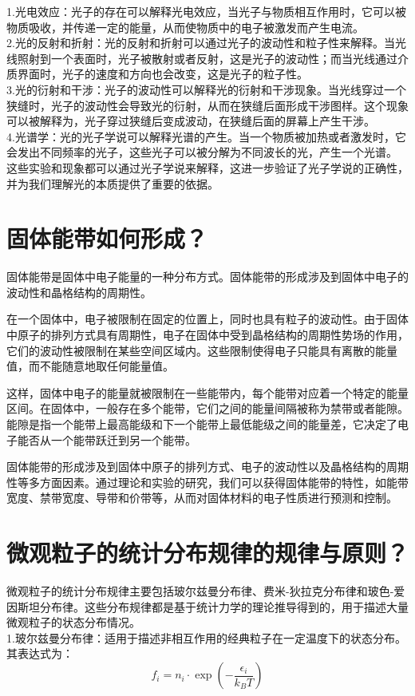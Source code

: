 \documentclass[12pt, a4paper, oneside]{article}
\begin{document}
\begin{spacing}{2.0}
1.光电效应：光子的存在可以解释光电效应，当光子与物质相互作用时，它可以被物质吸收，并传递一定的能量，从而使物质中的电子被激发而产生电流。
\\
2.光的反射和折射：光的反射和折射可以通过光子的波动性和粒子性来解释。当光线照射到一个表面时，光子被散射或者反射，这是光子的波动性；而当光线通过介质界面时，光子的速度和方向也会改变，这是光子的粒子性。
\\
3.光的衍射和干涉：光子的波动性可以解释光的衍射和干涉现象。当光线穿过一个狭缝时，光子的波动性会导致光的衍射，从而在狭缝后面形成干涉图样。这个现象可以被解释为，光子穿过狭缝后变成波动，在狭缝后面的屏幕上产生干涉。
\\
4.光谱学：光的光子学说可以解释光谱的产生。当一个物质被加热或者激发时，它会发出不同频率的光子，这些光子可以被分解为不同波长的光，产生一个光谱。
\\
这些实验和现象都可以通过光子学说来解释，这进一步验证了光子学说的正确性，并为我们理解光的本质提供了重要的依据。


\section{固体能带如何形成？}
固体能带是固体中电子能量的一种分布方式。固体能带的形成涉及到固体中电子的波动性和晶格结构的周期性。

在一个固体中，电子被限制在固定的位置上，同时也具有粒子的波动性。由于固体中原子的排列方式具有周期性，电子在固体中受到晶格结构的周期性势场的作用，它们的波动性被限制在某些空间区域内。这些限制使得电子只能具有离散的能量值，而不能随意地取任何能量值。

这样，固体中电子的能量就被限制在一些能带内，每个能带对应着一个特定的能量区间。在固体中，一般存在多个能带，它们之间的能量间隔被称为禁带或者能隙。能隙是指一个能带上最高能级和下一个能带上最低能级之间的能量差，它决定了电子能否从一个能带跃迁到另一个能带。

固体能带的形成涉及到固体中原子的排列方式、电子的波动性以及晶格结构的周期性等多方面因素。通过理论和实验的研究，我们可以获得固体能带的特性，如能带宽度、禁带宽度、导带和价带等，从而对固体材料的电子性质进行预测和控制。

\section{微观粒子的统计分布规律的规律与原则？}
微观粒子的统计分布规律主要包括玻尔兹曼分布律、费米-狄拉克分布律和玻色-爱因斯坦分布律。这些分布规律都是基于统计力学的理论推导得到的，用于描述大量微观粒子的状态分布情况。
\\
1.玻尔兹曼分布律：适用于描述非相互作用的经典粒子在一定温度下的状态分布。其表达式为：
\begin{equation}
f_i = n_i\cdot \exp\left(-\frac{\epsilon_i}{k_BT}\right)
\end{equation}


\end{spacing}
\end{document}
